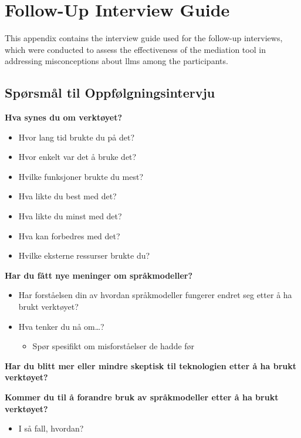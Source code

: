 \chapter{Follow-Up Interview Guide}\label{follow-up}
This appendix contains the interview guide used for the follow-up interviews, which were conducted to assess the effectiveness of the mediation tool in addressing misconceptions about \gls{llms} among the participants.

\section*{Spørsmål til Oppfølgningsintervju}

\textbf{Hva synes du om verktøyet?}
\begin{itemize}
\item Hvor lang tid brukte du på det?
\item Hvor enkelt var det å bruke det?
\item Hvilke funksjoner brukte du mest?
\item Hva likte du best med det?
\item Hva likte du minst med det?
\item Hva kan forbedres med det?
\item Hvilke eksterne ressurser brukte du?
\end{itemize}

\textbf{Har du fått nye meninger om språkmodeller?}
\begin{itemize}
\item Har forståelsen din av hvordan språkmodeller fungerer endret seg etter å ha brukt verktøyet?
\item Hva tenker du nå om\ldots?
\begin{itemize}
\item Spør spesifikt om misforståelser de hadde før
\end{itemize}
\end{itemize}

\textbf{Har du blitt mer eller mindre skeptisk til teknologien etter å ha brukt verktøyet?}

\textbf{Kommer du til å forandre bruk av språkmodeller etter å ha brukt verktøyet?}
\begin{itemize}
\item I så fall, hvordan?
\end{itemize}